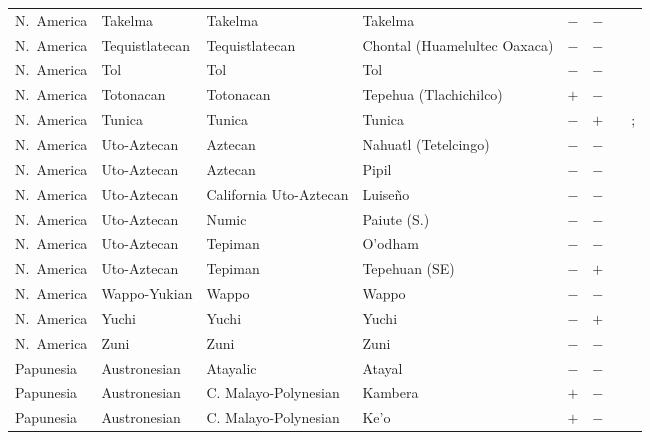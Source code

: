\begin{landscape}
\begin{longtable}{l>{\raggedright\arraybackslash}p{2.2cm}>{\raggedright}p{2.5cm}>{\raggedright\arraybackslash}p{2.5cm}cc>{\raggedright\arraybackslash}p{3.4cm}>{\raggedright\arraybackslash}p{3.4cm}}
N.~America & Takelma & Takelma & Takelma & $-$ & $-$ & \citealt{Gil2013} & \citealt[299]{Nichols1992}\\
N.~America & Tequistlatecan & Tequistlatecan & Chontal (Huamelultec Oaxaca) & $-$ & $-$ & \citealt[301]{Nichols1992} & \citealt[356--358]{Waterhouse1967}\\
N.~America & Tol & Tol & Tol & $-$ & $-$ & \citealt{Gil2013} & \citealt{Corbett2013}\\
N.~America & Totonacan & Totonacan & Tepehua (Tlachichilco) & $+$ & $-$ & \citealt[301]{Nichols1992} & \citealt[301]{Nichols1992}\\
N.~America & Tunica & Tunica & Tunica & $-$ & $+$ & \citealt{Gil2013} & \citealt{Corbett2013}; \citealt[36--38, 62, 64--65, 102--110]{Haas1940}\\
N.~America & Uto-Aztecan & Aztecan & Nahuatl (Tetelcingo) & $-$ & $-$ & \citealt{Gil2013} & \citealt{Corbett2013}\\
N.~America & Uto-Aztecan & Aztecan & Pipil & $-$ & $-$ & \citealt{Gil2013} & \citealt{Corbett2013}\\
N.~America & Uto-Aztecan & California Uto-Aztecan & Luiseño & $-$ & $-$ & \citealt{Gil2013} & \citealt[23--28]{Elliott1999}\\
N.~America & Uto-Aztecan & Numic & Paiute (S.) & $-$ & $-$ & \citealt{Gil2013} & \citealt[299]{Nichols1992}\\
N.~America & Uto-Aztecan & Tepiman & O'odham & $-$ & $-$ & \citealt{Gil2013} & \citealt[299]{Nichols1992}\\
N.~America & Uto-Aztecan & Tepiman & Tepehuan (SE) & $-$ & $+$ & \citealt{Gil2013} & \citealt[83--84]{Willett1991}\\
N.~America & Wappo-Yukian & Wappo & Wappo & $-$ & $-$ & \citealt{Gil2013} & \citealt[299]{Nichols1992}\\
N.~America & Yuchi & Yuchi & Yuchi & $-$ & $+$ & \citealt{Gil2013} & \citealt[301]{Nichols1992}\\
N.~America & Zuni & Zuni & Zuni & $-$ & $-$ & \citealt{Gil2013} & \citealt{Corbett2013}\\
Papunesia & Austronesian & Atayalic & Atayal & $-$ & $-$ & \citealt{Gil2013} & \citealt[passim]{Rau1992}\\
Papunesia & Austronesian & C. Malayo-Polynesian & Kambera & $+$ & $-$ & \citealt{Gil2013} & \citealt{Corbett2013}\\
Papunesia & Austronesian & C. Malayo-Polynesian & Ke'o & $+$ & $-$ & \citealt{Gil2013} & \citealt[passim]{Baird2002}\\

\end{longtable}
\end{landscape}
